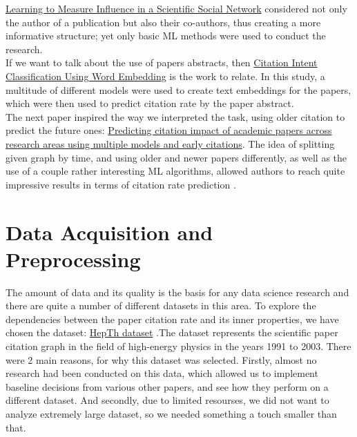 \documentclass{article}
\newcommand\tab[1][1cm]{\hspace*{#1}}
\begin{document}
\tab \href{https://link.springer.com/chapter/10.1007/978-3-319-06483-3_4?fromPaywallRec=true}{Learning to Measure Influence in a Scientific Social Network} considered not only the author of a publication but also their co-authors, thus creating a more informative structure; yet only basic ML methods were used to conduct the research.\\

\tab If we want to talk about the use of papers abstracts, then \href{https://www.researchgate.net/publication/348440299_Citation_Intent_Classification_Using_Word_Embedding}{Citation Intent Classification Using Word Embedding} is the work to relate. In this study, a multitude of different models were used to create text embeddings for the papers, which were then used to predict citation rate by the paper abstract.\\

\tab The next paper inspired the way we interpreted the task, using older citation to predict the future ones: \href{https://www.researchgate.net/publication/381695536_Predicting_citation_impact_of_academic_papers_across_research_areas_using_multiple_models_and_early_citations}{Predicting citation impact of academic papers across research areas using multiple models and early citations}. The idea of splitting given graph by time, and using older and newer papers differently, as well as the use of a couple rather interesting ML algorithms, allowed authors to reach quite impressive results in terms of citation rate prediction .\\
\section{Data Acquisition and Preprocessing}

\tab	The amount of data and its quality is the basis for any data science research and there are quite a number of different datasets in this area. To explore the dependencies between the paper citation rate and its inner properties, we have chosen the dataset: \href{https://www.kaggle.com/datasets/wolfram77/graphs-snap-cit}{HepTh dataset} .The dataset represents the scientific paper citation graph in the field of high-energy physics in the years 1991 to 2003. There were 2 main reasons, for why this dataset was selected. Firstly, almost no research had been conducted on this data, which allowed us to implement baseline decisions from various other papers, and see how they perform on a different dataset. And secondly, due to limited resourses, we did not want to analyze extremely large dataset, so we needed something a touch smaller than that. \\
\end{document}
